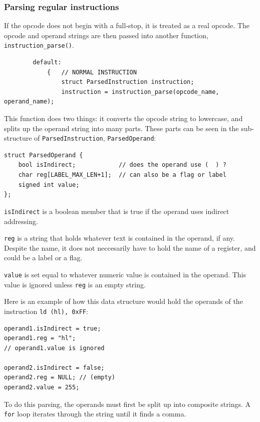 \documentclass[a4paper]{report}
\begin{document}
\subsubsection{Parsing regular instructions}

If the opcode does not begin with a full-stop, it is treated as a real opcode.
The opcode and operand strings are then passed into another function,
\texttt{instruction\_parse()}.

\begin{lstlisting}
		default:
			{	// NORMAL INSTRUCTION
				struct ParsedInstruction instruction;
				instruction = instruction_parse(opcode_name, operand_name);
\end{lstlisting}

This function does two things: it converts the opcode string to lowercase, and
splits up the operand string into many parts. These parts can be seen in the
sub-structure of \texttt{ParsedInstruction}, \texttt{ParsedOperand}:

\begin{lstlisting}
struct ParsedOperand {
	bool isIndirect;			// does the operand use (  ) ?
	char reg[LABEL_MAX_LEN+1];	// can also be a flag or label
	signed int value;
};
\end{lstlisting}

\texttt{isIndirect} is a boolean member that is true if the operand uses
indirect addressing.

\texttt{reg} is a string that holds whatever text is contained in the operand,
if any. Despite the name, it does not neccesarily have to hold the name of a
register, and could be a label or a flag.

\texttt{value} is set equal to whatever numeric value is contained in the
operand. This value is ignored unless \texttt{reg} is an empty string.

Here is an example of how this data structure would hold the operands of the
instruction \texttt{ld (hl), 0xFF}:

\begin{lstlisting}
operand1.isIndirect = true;
operand1.reg = "hl";
// operand1.value is ignored

operand2.isIndirect = false;
operand2.reg = NULL; // (empty)
operand2.value = 255;
\end{lstlisting}

To do this parsing, the operands must first be split up into composite strings.
A \texttt{for} loop iterates through the string until it finds a comma.
\end{document}
